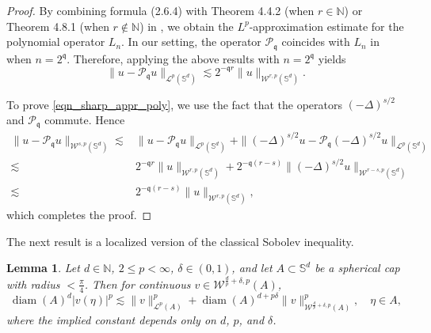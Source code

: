 \documentclass{article}
\numberwithin{equation}{section}
\newtheorem{lemma}{Lemma}
\def\NN{\mathbb{N}}
\def\SS{\mathbb{S}}
\def\mq{\mathfrak{q}}
\def\mP{\mathcal{P}}
\begin{document}
\begin{proof}
By combining formula (2.6.4) with Theorem 4.4.2 (when $r\in\NN$) or Theorem 4.8.1 (when $r\notin\NN$) in \cite{dai2013approximation}, we obtain the $L^p$-approximation estimate for the polynomial operator $L_n$. In our setting, the operator $\mP_\mq$ coincides with $L_n$ in \cite{dai2013approximation} when $n=2^\mq$. Therefore, applying the above results with $n=2^\mq$ yields
\begin{equation*}
    \|u-\mP_\mq u\|_{\mathcal L^p(\SS^d)}\lesssim2^{-\mq r}\|u\|_{\mathcal{W}^{r,p}(\SS^d)}.
\end{equation*}

    To prove \eqref{eqn_sharp_appr_poly}, we use the fact that the operators $(-\Delta)^{s/2}$ and $\mP_\mq$ commute. Hence
    \begin{equation*}
        \begin{split}
            \|u-\mP_\mq u\|_{\mathcal W^{s,p}(\SS^d)}
            \lesssim{}&\|u-\mP_\mq u\|_{\mathcal L^p(\SS^d)}+\|(-\Delta)^{s/2}u-\mP_\mq(-\Delta)^{s/2}u\|_{\mathcal L^p(\SS^d)}\\
            \lesssim{}&2^{-\mq r}\|u\|_{\mathcal W^{r,p}(\SS^d)}+2^{-\mq(r-s)}\|(-\Delta)^{s/2}u\|_{\mathcal W^{r-s,p}(\SS^d)}\\
            \lesssim{}&2^{-\mq(r-s)}\|u\|_{\mathcal W^{r,p}(\SS^d)},
        \end{split}
    \end{equation*}
    which completes the proof.
\end{proof}





The next result is a localized version of the classical Sobolev inequality.

\begin{lemma}\label{lem:ext_cell_sobolev}
Let $d\in\NN$, $2\leq p<\infty$, $\delta\in(0,1)$, and let $A\subset\SS^d$ be a spherical cap with radius $<\frac{\pi}{4}$. Then for continuous $v\in\mathcal W^{\frac dp+\delta,p}(A)$,
\begin{equation}\label{eqn:ext_cell_sobolev}
    \operatorname{diam}(A)^{d}|v(\eta)|^p\lesssim \|v\|_{\mathcal{L}^p(A)}^p+\operatorname{diam}(A)^{d+p\delta}\|v\|_{\mathcal W^{\frac dp+\delta,p}(A)}^p,\quad\eta\in A,
\end{equation}
where the implied constant depends only on $d$, $p$, and $\delta$.
\end{lemma}
\end{document}
